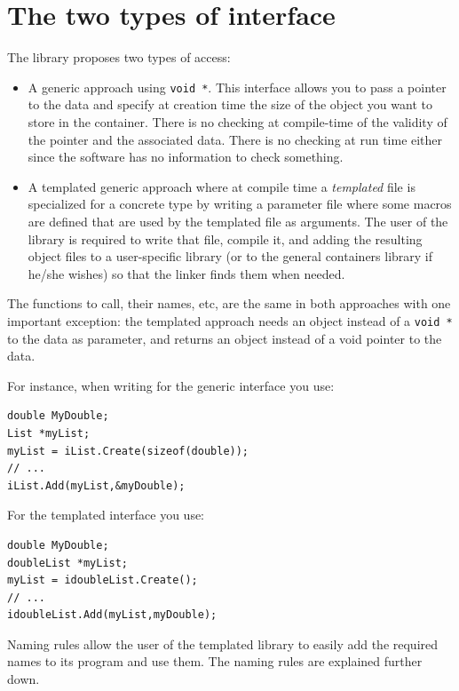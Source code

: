 \documentclass[12pt,a4paper]{memoir} %
\begin{document}
\section{The two types of interface}
\label{TwoTypes}
The library proposes two types of access:
\begin{itemize}
\item A generic approach using \verb,void *,. This interface allows you to pass a pointer to the data and specify at creation time the size of the 
object you want to store in the container. There is no checking at compile-time of the validity of the pointer and the associated data. There is no 
checking at run time either since the software has no information to check something.
\item A templated generic approach where at compile time a \textsl{templated} file is specialized for a concrete type by writing a parameter file
where some macros are defined that are used by the templated file as arguments. The user of the library is required to write that file, compile
it, and adding the resulting object files to a user-specific library (or to the general containers library if he/she wishes) so that the linker finds 
them when needed.

\end{itemize}
The functions to call, their names, etc, are the same in both approaches with one important exception: the templated approach needs an object instead 
of a \verb,void *, to the data as parameter, and returns an object instead of a void pointer to the data.

For instance, when writing for the generic interface you use:
\begin{verbatim}
double MyDouble;
List *myList;
myList = iList.Create(sizeof(double));
// ...
iList.Add(myList,&myDouble);
\end{verbatim}

For the templated interface you use:
\begin{verbatim}
double MyDouble;
doubleList *myList;
myList = idoubleList.Create();
// ...
idoubleList.Add(myList,myDouble);
\end{verbatim}


Naming rules allow the user of the templated library to easily add
the required names to its program and use them. The naming rules are explained further down.
\end{document}
